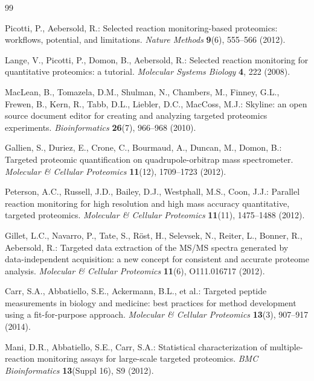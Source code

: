 \documentclass[11pt,twoside,openright]{book}
\begin{document}
\begin{thebibliography}{99}
\small

Picotti, P., Aebersold, R.: Selected reaction monitoring-based proteomics: workflows, potential, and limitations.
\textit{Nature Methods} \textbf{9}(6), 555--566 (2012).

Lange, V., Picotti, P., Domon, B., Aebersold, R.: Selected reaction monitoring for quantitative proteomics: a tutorial.
\textit{Molecular Systems Biology} \textbf{4}, 222 (2008).

MacLean, B., Tomazela, D.M., Shulman, N., Chambers, M., Finney, G.L., Frewen, B., Kern, R., Tabb, D.L., Liebler, D.C., MacCoss, M.J.: Skyline: an open source document editor for creating and analyzing targeted proteomics experiments.
\textit{Bioinformatics} \textbf{26}(7), 966--968 (2010).

Gallien, S., Duriez, E., Crone, C., Bourmaud, A., Duncan, M., Domon, B.: Targeted proteomic quantification on quadrupole-orbitrap mass spectrometer.
\textit{Molecular \& Cellular Proteomics} \textbf{11}(12), 1709--1723 (2012).

Peterson, A.C., Russell, J.D., Bailey, D.J., Westphall, M.S., Coon, J.J.: Parallel reaction monitoring for high resolution and high mass accuracy quantitative, targeted proteomics.
\textit{Molecular \& Cellular Proteomics} \textbf{11}(11), 1475--1488 (2012).

Gillet, L.C., Navarro, P., Tate, S., R{\"o}st, H., Selevsek, N., Reiter, L., Bonner, R., Aebersold, R.: Targeted data extraction of the MS/MS spectra generated by data-independent acquisition: a new concept for consistent and accurate proteome analysis.
\textit{Molecular \& Cellular Proteomics} \textbf{11}(6), O111.016717 (2012).

Carr, S.A., Abbatiello, S.E., Ackermann, B.L., et al.: Targeted peptide measurements in biology and medicine: best practices for method development using a fit-for-purpose approach.
\textit{Molecular \& Cellular Proteomics} \textbf{13}(3), 907--917 (2014).

Mani, D.R., Abbatiello, S.E., Carr, S.A.: Statistical characterization of multiple-reaction monitoring assays for large-scale targeted proteomics.
\textit{BMC Bioinformatics} \textbf{13}(Suppl 16), S9 (2012).


\end{thebibliography}
\end{document}
